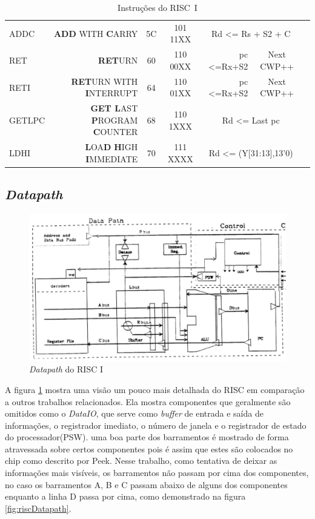 \documentclass[
	article,			%
	11pt,				%
	oneside,			%
	a4paper,			%
	english,			%
	brazil,				%
	sumario=tradicional
	]{abntex2}
\begin{document}
\begin{table}[!htp]
\begin{tabular}{lrccrrrr}
ADDC &\textbf{ADD} WITH \textbf{C}ARRY &5C &101 11XX &\multicolumn{3}{c}{Rd <= Rs + S2 + C} \\
RET &\textbf{RET}URN &60 &110 00XX &pc <=Rx+S2 &\multicolumn{2}{c}{Next CWP++} \\
RETI &\textbf{RET}URN WITH \textbf{I}NTERRUPT &64 &110 01XX &pc <=Rx+S2 &\multicolumn{2}{c}{Next CWP++} \\
GETLPC &\textbf{GET L}AST \textbf{P}ROGRAM \textbf{C}OUNTER &68 &110 1XXX &\multicolumn{3}{c}{Rd <= Last pc} \\
LDHI &\textbf{L}OA\textbf{D} \textbf{H}IGH \textbf{I}MMEDIATE &70 &111 XXXX &\multicolumn{3}{c}{Rd <= (Y[31:13],13'0)} \\
\bottomrule
\end{tabular}
\caption{Instruções do RISC~I}\label{tab:instructionSetDetail }
\end{table}

\subsection{\textit{Datapath}}\label{cap:datapath}
\begin{figure}[H]
    \centering
    \includegraphics[width=0.75\linewidth]{Original/datapathPeek.png}
    \caption{\textit{Datapath} do RISC I\cite{peek_vlsi_1983}}
    \label{fig:riscDatapathPeek}
\end{figure}
A figura \ref{fig:riscDatapathPeek} mostra uma visão um pouco mais detalhada do RISC em comparação a outros trabalhos relacionados. Ela mostra componentes que geralmente são omitidos como o \textit{DataIO}, que serve como \textit{buffer} de entrada e saída de informações, o registrador imediato, o número de janela e o registrador de estado do processador(PSW). 
uma boa parte dos barramentos é mostrado de forma atravessada sobre certos componentes pois é assim que estes são colocados no chip como descrito por Peek. Nesse trabalho, como tentativa de deixar as informações mais visíveis, os barramentos não passam por cima dos componentes, no caso os barramentos A, B e C passam abaixo de alguns dos componentes enquanto a linha D passa por cima, como demonstrado na figura \ref{fig:riscDatapath}. 
\end{document}
